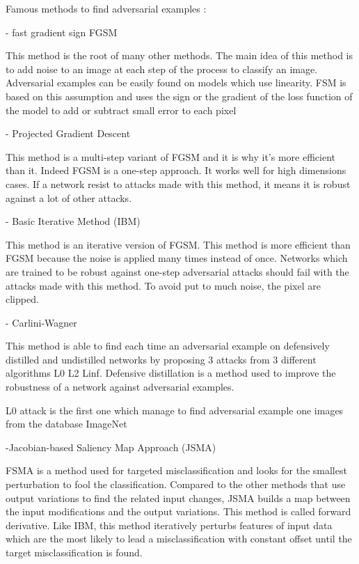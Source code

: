 Famous methods to find adversarial examples :

- fast gradient sign FGSM

This method is the root of many other methods. The main idea of this method is to add noise to an image at each step of the process to classify an image. Adversarial examples can be easily found on models which use linearity. FSM is based on this assumption and uses the sign or the gradient of the loss function of the model to add or subtract small error to each pixel

- Projected Gradient Descent

This method is a multi-step variant of FGSM and it is why it's more efficient than it. Indeed FGSM is a one-step approach.
It works well for high dimensions cases. 
If a network resist to attacks made with this method, it means it is robust against a lot of other attacks.


- Basic Iterative Method (IBM)

This method is an iterative version of FGSM. This method is more efficient than FGSM because the noise is applied many times instead of once.  Networks which are trained to be robust against one-step adversarial attacks should fail with the attacks made with this method. To avoid put to much noise, the pixel are clipped.


- Carlini-Wagner

This method is able to find each time an adversarial example on defensively distilled and undistilled networks by proposing  3 attacks from 3  different algorithms L0 L2 Linf.  Defensive distillation is a method used to improve the robustness of a network against adversarial examples.

L0 attack  is the first one which manage to find adversarial example one images from the database ImageNet


-Jacobian-based Saliency Map Approach (JSMA)

FSMA is a method  used for targeted misclassification and looks for the smallest perturbation to fool the classification. Compared to the other methods that use output variations to find the related input changes, JSMA builds a map between the input modifications and the output variations. This method is called forward derivative. Like IBM, this method iteratively perturbs features of input data which are the most likely to lead a misclassification with constant offset until the target misclassification is found.

 














